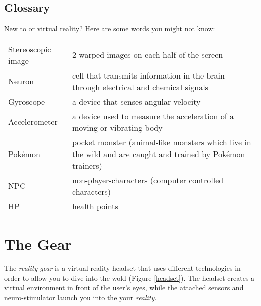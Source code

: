 \section{Glossary}
New to \poke{} or virtual reality? Here are some words you might not know:\\
\begin{tabular}{L{.3}L{.7}}
Stereoscopic image & 2 warped images on each half of the screen\\
Neuron \newline & cell that transmits information in the brain through electrical and chemical signals\\
Gyroscope & a device that senses angular velocity\\
Accelerometer \newline & a device used to measure the acceleration of a moving or vibrating body\\
Pokémon\newline & pocket monster (animal-like monsters which live in the wild and are caught and trained by Pokémon trainers)\\
NPC & non-player-characters (computer controlled characters)\\
HP & health points\\
\end{tabular}

\chapter{The Gear}

The \emph{\poke{} reality gear} is a virtual reality headset that uses different technologies in order to allow you to dive into the \poke{} wold (Figure \ref{headset}). The headset creates a virtual environment in front of the user's eyes, while the attached sensors and neuro-stimulator launch you into the your \emph{\poke{} reality}.

